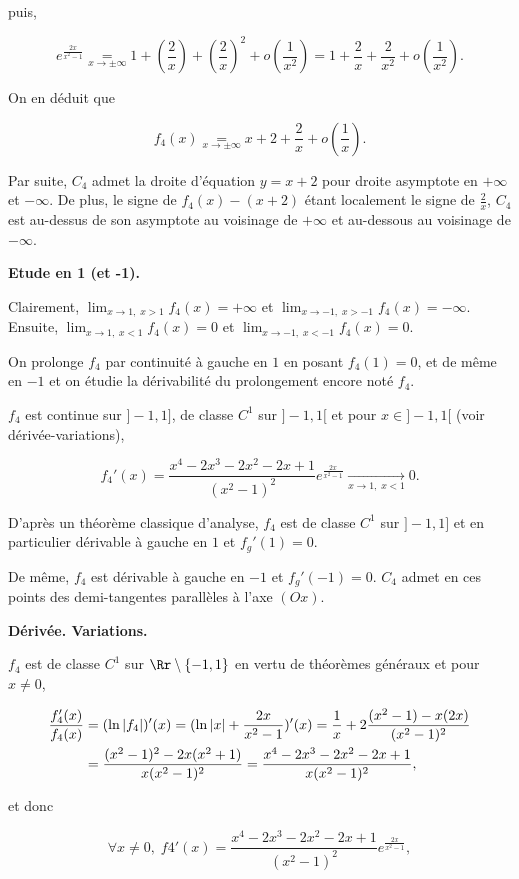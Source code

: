 {\begin{enumerate}
{puis,

$$e^{\frac{2x}{x^2-1}}\underset{x\rightarrow\pm\infty}{=}1+(\frac{2}{x})+(\frac{2}{x})^2+ o(\frac{1}{x^2})=1+\frac{2}{x}+\frac{2}{x^2}+ o(\frac{1}{x^2}).$$

On en déduit que

$$f_4(x)\underset{x\rightarrow\pm\infty}{=}x+2+\frac{2}{x}+o(\frac{1}{x}).$$

Par suite, $C_4$ admet la droite d'équation $y=x+2$ pour droite asymptote en $+\infty$ et $-\infty$. De plus, le signe de $f_4(x)-(x+2)$ étant localement le signe de $\frac{2}{x}$, $C_4$ est au-dessus de son asymptote au voisinage de $+\infty$ et au-dessous au voisinage de $-\infty$.

\textbf{Etude en 1 (et -1).}

Clairement, $\lim_{x\rightarrow 1,\;x>1}f_4(x)=+\infty$ et $\lim_{x\rightarrow -1,\;x>-1}f_4(x)=-\infty$. Ensuite, $\lim_{x\rightarrow 1,\;x<1}f_4(x)=0$ et $\lim_{x\rightarrow -1,\;x<-1}f_4(x)=0$.

On prolonge $f_4$ par continuité à gauche en $1$ en posant $f_4(1)=0$, et de même en $-1$ et on étudie la dérivabilité du prolongement encore noté $f_4$.

$f_4$ est continue sur $]-1,1]$, de classe $C^1$ sur $]-1,1[$ et pour $x\in]-1,1[$ (voir dérivée-variations), 

$$f_4'(x)=\frac{x^4-2x^3-2x^2-2x+1}{(x^2-1)^2}e^{\frac{2x}{x^2-1}}\underset{x\rightarrow1,\;x<1}{\rightarrow}0.$$

D'après un théorème classique d'analyse, $f_4$ est de classe $C^1$ sur $]-1,1]$ et en particulier dérivable à gauche en $1$ et $f_g'(1)=0$.

De même, $f_4$ est dérivable à gauche en $-1$ et $f_g'(-1)=0$. $C_4$ admet en ces points des demi-tangentes parallèles à l'axe $(Ox)$.

\textbf{Dérivée. Variations.}

$f_4$ est de classe $C^1$ sur $\Rr\setminus\{-1,1\}$ en vertu de théorèmes généraux et pour $x\neq 0$,

\begin{align*}\ensuremath
\frac{f_4'(x)}{f_4(x)}&=(\ln|f_4|)'(x)=(\ln|x|+\frac{2x}{x^2-1})'(x)=\frac{1}{x}+2\frac{(x^2-1)-x(2x)}{(x^2-1)^2}\\
 &=\frac{(x^2-1)^2-2x(x^2+1)}{x(x^2-1)^2}=\frac{x^4-2x^3-2x^2-2x+1}{x(x^2-1)^2},
\end{align*}
 
et donc 

$$\forall x\neq 0,\;f4'(x)=\frac{x^4-2x^3-2x^2-2x+1}{(x^2-1)^2}e^{\frac{2x}{x^2-1}},$$

}
\end{enumerate}}
